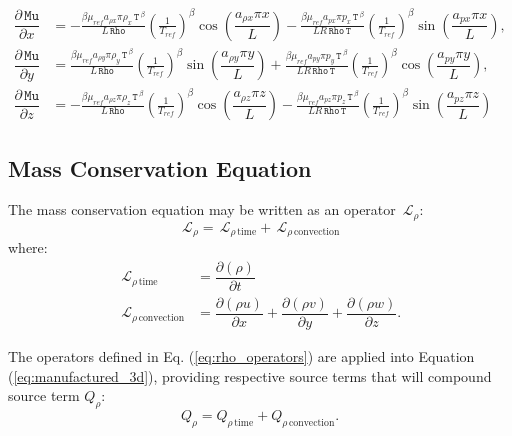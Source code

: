 \documentclass[10pt]{article}
\newcommand{\Diff}[2] {\dfrac{\partial( #1)}{\partial #2}}
\newcommand{\diff}[2] {\dfrac{\partial #1}{\partial #2}}
\newcommand{\Rho}{\,\mathtt{Rho}}
\newcommand{\Lo}{\,\mathcal{L}}
\newcommand{\Mu}{\,\mathtt{Mu}}
\newcommand{\T}{\,\mathtt{T}\,}
\newcommand{\DMuDx}{\diff{\Mu}{x}}
\newcommand{\DMuDy}{\diff{\Mu}{y}}
\newcommand{\DMuDz}{\diff{\Mu}{z}}
\begin{document}
\begin{equation}\label{eq:aux_02}
 \begin{split}
\DMuDx&=  
- \frac{ \beta \mu_{ref} a_{\rho x} \pi \rho_{x} \T^{\beta}}{L \Rho} \left(\frac{1}{T_{ref}}\right)^{\beta} \cos\left(\dfrac{a_{\rho x} \pi x}{L}\right) - \frac{\beta \mu_{ref} a_{px} \pi p_{x} \T^{\beta} }{L R \Rho \T}\left(\frac{1}{T_{ref}}\right)^{\beta}
\sin\left(\dfrac{a_{px} \pi x}{L}\right),\\
%
 \DMuDy&=  
\frac{\beta \mu_{ref} a_{\rho y} \pi \rho_{y} \T^{\beta} }{L \Rho} \left(\frac{1}{T_{ref}}\right)^{\beta} \sin\left(\dfrac{a_{\rho y} \pi y}{L}\right)+ \frac{\beta \mu_{ref} a_{py} \pi p_{y} \T^{\beta} }{L R \Rho \T}\left(\frac{1}{T_{ref}}\right)^{\beta}
\cos\left(\dfrac{a_{py} \pi y}{L}\right),\\
%
\DMuDz&=  
- \frac{\beta \mu_{ref} a_{\rho z} \pi \rho_{z} \T^{\beta} }{L \Rho} \left(\frac{1}{T_{ref}}\right)^{\beta} \cos\left(\dfrac{a_{\rho z} \pi z}{L}\right)- \frac{\beta \mu_{ref} a_{pz} \pi p_{z} \T^{\beta} }{L R \Rho \T}\left(\frac{1}{T_{ref}}\right)^{\beta}
\sin\left(\dfrac{a_{pz} \pi z}{L}\right)
 \end{split}
\end{equation}


\subsection{Mass Conservation Equation}

The mass conservation equation may be written as an operator $\Lo_\rho$:
$$ \Lo_{\rho} = \Lo_{\rho \, \text{time}}+\Lo_{\rho \, \text{convection}}$$
where:
\begin{equation}
\begin{split}\label{eq:rho_operators}
\Lo_{\rho \, \text{time}}&=\Diff{\rho}{t} \\
\Lo_{\rho \, \text{convection}}&=\Diff{\rho u}{x}+\Diff{\rho v}{y} + \Diff{\rho w}{z}.
\end{split}
 \end{equation}

The operators defined in Eq. (\ref{eq:rho_operators}) are applied into Equation  (\ref{eq:manufactured_3d}), providing respective source terms that will compound source term $Q_{\rho}$:
\begin{equation*}
 Q_{\rho} = Q_{\rho \, \text{time}}+Q_{\rho \, \text{convection}}.
\end{equation*}
\end{document}
